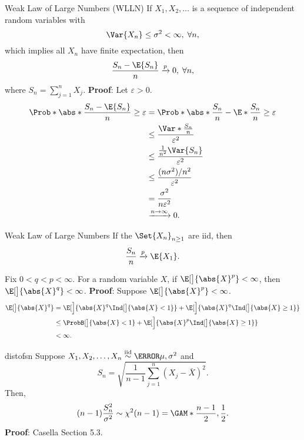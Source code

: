 \begin{Theorem}{Weak Law of Large Numbers (WLLN)}{}
    If $ X_1,X_2,\ldots $ is a sequence of independent random variables
    with
    \[ \Var{X_n}\le \sigma^2<\infty,\; \forall n, \]
    which implies all $ X_n $ have finite expectation, then
    \[ \frac{S_n-\E{S_n}}{n}\inp 0,\; \forall n, \]
    where $ S_n=\sum_{j=1}^{n}X_j $.
    \tcblower{}
    \textbf{Proof}: Let $ \varepsilon>0 $.
    \begin{align*}
        \Prob*{\abs*{\frac{S_n-\E{S_n}}{n}}\ge \varepsilon}
         & =\Prob*{\abs*{\frac{S_n}{n}-\E*{\frac{S_n}{n}}}\ge \varepsilon} \\
         & \le \frac{\Var*{\frac{S_n}{n}}}{\varepsilon^2}                  \\
         & \le \frac{\frac{1}{n^2}\Var{S_n}}{\varepsilon^2}                \\
         & \le \frac{(n\sigma^2)/n^2}{\varepsilon^2}                       \\
         & =\frac{\sigma^2}{n\varepsilon^2}                                \\
         & \xrightarrow{n\to\infty}0.
    \end{align*}
\end{Theorem}
\begin{Corollary}{Weak Law of Large Numbers}{}
    If the $ \Set{X_n}_{n\ge 1} $ are iid, then
    \[ \frac{S_n}{n}\inp \E{X_1}. \]
\end{Corollary}
\begin{Theorem}{}{}
    Fix $ 0<q<p<\infty $. For a random variable $ X $, if
    $ \E[\big]{\abs{X}^p}<\infty $, then $ \E[\big]{\abs{X}^q}<\infty $.
    \tcblower{}
    \textbf{Proof}: Suppose $ \E[\big]{\abs{X}^p}<\infty $.
    \begin{align*}
        \E[\big]{\abs{X}^q}
         & =\E[\Big]{\abs{X}^q\Ind[\big]{\abs{X}<1}}+\E[\Big]{\abs{X}^q\Ind[\big]{\abs{X}\ge 1}} \\
         & \le \ProbB[\big]{\abs{X}<1}+\E[\Big]{\abs{X}^p\Ind[\big]{\abs{X}\ge 1}}               \\
         & <\infty.
    \end{align*}
\end{Theorem}
\begin{Theorem}{}{distofsn}
    Suppose $ X_1,X_2,\ldots,X_n \iid\N{\mu,\sigma^2} $ and
    \[ S_n=\sqrt{\frac{1}{n-1}\sum_{j=1}^{n}(X_j-\bar{X})^2}. \]
    Then,
    \[ (n-1)\frac{S_n^2}{\sigma^2}\sim \chi^2(n-1)=\GAM*{\frac{n-1}{2},\frac{1}{2}}. \]
    \tcblower{}
    \textbf{Proof}: Casella Section 5.3.
\end{Theorem}
